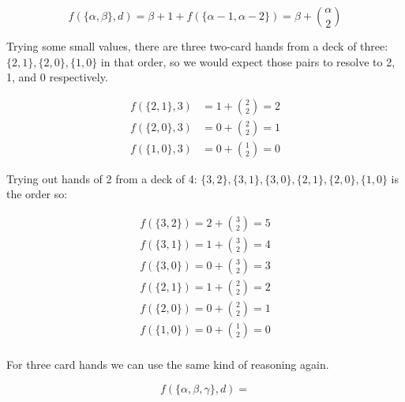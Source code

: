 \documentclass{article}
\begin{document}
\begin{equation}
    f(\{\alpha, \beta\}, d) = \beta + 1 + f(\{\alpha - 1,\alpha - 2\})
    = \beta + {\alpha \choose 2}
\end{equation}

Trying some small values, there are three two-card hands from a deck of three: $\{2,1\},\{2,0\}, \{1,0\}$ in that order, so we would expect those pairs to resolve to 2, 1, and 0 respectively.

\begin{align*}
    f(\{2,1\}, 3) &= 1 + {2 \choose 2} = 2 \\
    f(\{2,0\}, 3) &= 0 + {2 \choose 2} = 1 \\
    f(\{1,0\}, 3) &= 0 + {1 \choose 2} = 0
\end{align*}

Trying out hands of 2 from a deck of 4: $\{3,2\},\{3,1\},\{3,0\},\{2,1\},\{2,0\},\{1,0\}$ is the order so:

\begin{align*}
    f(\{3,2\}) = 2 + {3 \choose 2} = 5 \\
    f(\{3,1\}) = 1 + {3 \choose 2} = 4 \\
    f(\{3,0\}) = 0 + {3 \choose 2} = 3 \\
    f(\{2,1\}) = 1 + {2 \choose 2} = 2 \\
    f(\{2,0\}) = 0 + {2 \choose 2} = 1 \\
    f(\{1,0\}) = 0 + {1 \choose 2} = 0 \\
\end{align*}

For three card hands we can use the same kind of reasoning again.

\begin{equation}
    f(\{\alpha, \beta, \gamma\}, d) =
\end{equation}
\end{document}
